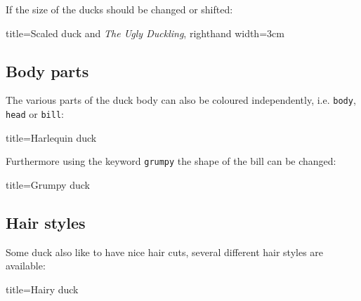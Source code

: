\documentclass[parskip=half]{scrartcl}
\begin{document}
\clearpage
If the size of the ducks should be changed or shifted:
\begin{tcblisting}{title={Scaled duck and \emph{The Ugly Duckling}},	righthand width=3cm}
\begin{tikzpicture}[scale=0.6]
	\duck
	\begin{scope}[xshift=90pt, scale=.3, yshift=150pt]
		\duck
	\end{scope}
	\begin{scope}[xshift=60pt, scale=.3, yshift=100pt]
		\duck
	\end{scope}
	\begin{scope}[xshift=80pt, scale=.3, yshift=50pt]
		\duck[body=gray!50!white,head=gray!50!white]
	\end{scope}		
\end{tikzpicture}
\end{tcblisting}

\subsection{Body parts}

The various parts of the duck body can also be coloured independently, i.e. \lstinline|body|, \lstinline|head| or \lstinline|bill|:
\begin{tcblisting}{title={Harlequin duck}}
\begin{tikzpicture}
	\duck[body=yellow,
		head=yellow!50!orange, 
		bill=red]
\end{tikzpicture}
\end{tcblisting}

Furthermore using the keyword \lstinline|grumpy| the shape of the bill can be changed:
\begin{tcblisting}{title={Grumpy duck}}
\begin{tikzpicture}
	\duck[grumpy]
\end{tikzpicture}
\begin{tikzpicture}
	\duck[grumpy, bill=cyan]
\end{tikzpicture}
\end{tcblisting}

\clearpage
\subsection{Hair styles}

Some duck also like to have nice hair cuts, several different hair styles are available:
\begin{tcblisting}{title={Hairy duck}}
\begin{tikzpicture}
	\duck[longhair]
\end{tikzpicture}
\begin{tikzpicture}
	\duck[shorthair]
\end{tikzpicture}

\begin{tikzpicture}
	\duck[crazyhair]
\end{tikzpicture}
\begin{tikzpicture}
	\duck[recedinghair]
\end{tikzpicture}
\end{tcblisting}
\end{document}

